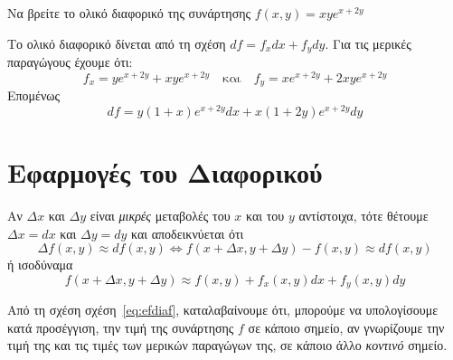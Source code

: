 \documentclass[a4paper,table]{report}
\begin{document}
\begin{example}
  Να βρείτε το ολικό διαφορικό της συνάρτησης $ f(x,y) = xye^{x+2y} $ 
\end{example}
\begin{solution}
\item {}
  Το ολικό διαφορικό δίνεται από τη σχέση $ df = f_{x} dx + f_{y} dy $.  
  Για τις μερικές παραγώγους έχουμε ότι: 
  \[
    f_{x} = ye^{x+2y}+xye^{x+2y} \quad \text{και} \quad f_{y} = xe^{x+2y} +
    2xye^{x+2y}
  \] 
  Επομένως
  \[
    df = y(1+x)e^{x+2y} dx + x(1+2y)e^{x+2y}dy
  \]
\end{solution}

\section{Εφαρμογές του Διαφορικού}

Αν $ \Delta x $ και $ \Delta y $ είναι \textit{μικρές} μεταβολές του $ x $ και του $y$ 
αντίστοιχα, τότε θέτουμε $ \Delta x = dx $ και $ \Delta y = dy $ και 
αποδεικνύεται ότι 
\[
  \Delta f(x,y) \approx df (x,y) \Leftrightarrow f(x+\Delta x, y+\Delta y) - f(x,y) 
  \approx df(x,y)
\] 
ή ισοδύναμα 
\begin{equation}\label{eq:efdiaf}
  \boxed{f(x+\Delta x, y+\Delta y) \approx f(x,y) + f_{x}(x,y)dx + f_{y}(x,y)dy}
\end{equation}

\begin{rem}
  Από τη σχέση σχέση~\eqref{eq:efdiaf}, καταλαβαίνουμε ότι, μπορούμε να υπολογίσουμε 
  κατά προσέγγιση, την τιμή της συνάρτησης $f$ σε κάποιο σημείο, αν γνωρίζουμε 
  την τιμή της και τις τιμές των μερικών παραγώγων της, σε κάποιο άλλο
  \textit{κοντινό} σημείο.
\end{rem}
\end{document}
